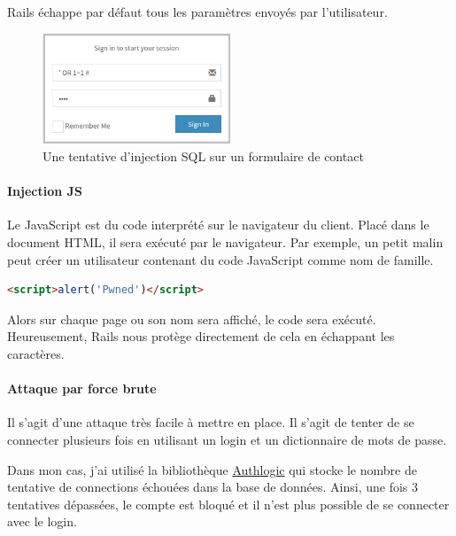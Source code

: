\documentclass[]{report}
\begin{document}
        Rails échappe par défaut tous les paramètres envoyés par l’utilisateur.

        \begin{figure}
          \centering
          \includegraphics[width=0.5\textwidth]{img/sql_injection.png}
          \caption{Une tentative d'injection SQL sur un formulaire de contact}
          \label{fig:sql_injection}
        \end{figure}

      \paragraph{Injection JS}

        Le JavaScript est du code interprété sur le navigateur du client. Placé dans le document HTML, il sera exécuté par le navigateur. Par exemple, un petit malin peut créer un utilisateur contenant du code JavaScript comme nom de famille.

        \begin{scriptsize}
          \begin{lstlisting}[language=html, caption={Un exemple d'injection SQL}]
          <script>alert('Pwned')</script>
          \end{lstlisting}
        \end{scriptsize}

        Alors sur chaque page ou son nom sera affiché, le code sera exécuté. Heureusement, Rails nous protège directement de cela en échappant les caractères.

      \paragraph{Attaque par force brute}

        Il s'agit d'une attaque très facile à mettre en place. Il s'agit de tenter de se connecter plusieurs fois en utilisant un login et un dictionnaire de mots de passe.

        Dans mon cas, j'ai utilisé la bibliothèque \href{https://github.com/binarylogic/authlogic}{Authlogic} qui stocke le nombre de tentative de connections échouées dans la base de données. Ainsi, une fois 3 tentatives dépassées, le compte est bloqué et il n'est plus possible de se connecter avec le login.
\end{document}
